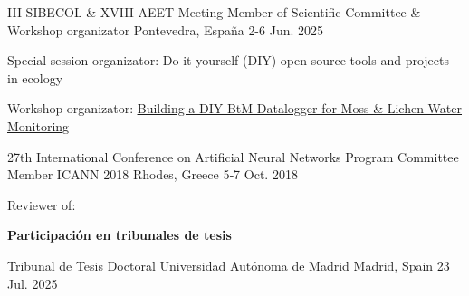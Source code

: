 \begin{cventries}
  \cventry
    {III SIBECOL \& XVIII AEET Meeting}
    {Member of Scientific Committee \& Workshop organizator}
    {Pontevedra, España}
    {2-6 Jun. 2025}
    {
  		\begin{cvitems}
        \item Special session organizator: Do-it-yourself (DIY) open source tools and projects in ecology
        \item Workshop organizator: \underline{\href{https://angellareo.github.io/workshop-btm/}{Building a DIY BtM Datalogger for Moss \& Lichen Water Monitoring}}
      \end{cvitems}
    }
\end{cventries}

\begin{cventries}
  \cventry
    {27th International Conference on Artificial Neural Networks}
    {Program Committee Member ICANN 2018}
    {Rhodes, Greece}
    {5‐7 Oct. 2018}
    {\begin{cvitems}
        \item Reviewer of: 
    \end{cvitems}	
    }
\end{cventries}

\textbf{Participación en tribunales de tesis}
\begin{cventries}
	\cventry
    {Tribunal de Tesis Doctoral}
    {Universidad Autónoma de Madrid}
    {Madrid, Spain}
    {23 Jul. 2025}
    {
  		\begin{cvitems}
  			\item {}
  		\end{cvitems}	
    }
\end{cventries}


